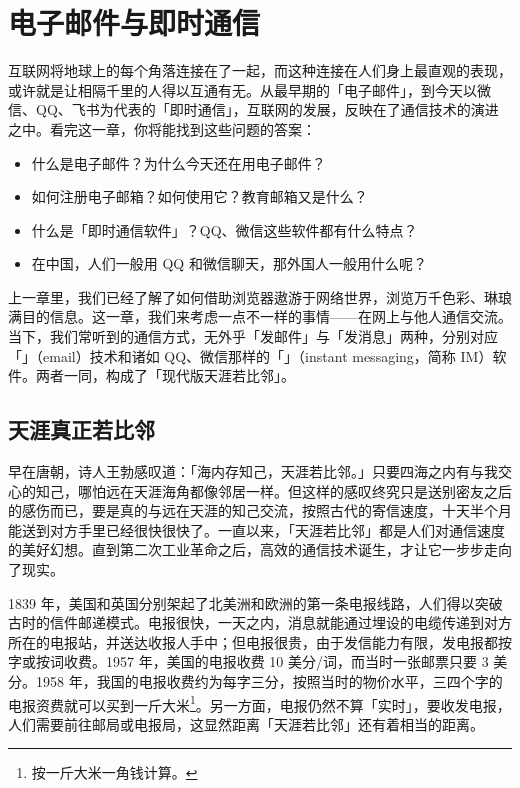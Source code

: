 
\chapter{电子邮件与即时通信}
\label{cha:mail-and-instant-messaging}

\begin{intro}
  互联网将地球上的每个角落连接在了一起，而这种连接在人们身上最直观的表现，或许就是让相隔千里的人得以互通有无。从最早期的「电子邮件」，到今天以微信、QQ、飞书为代表的「即时通信」，互联网的发展，反映在了通信技术的演进之中。看完这一章，你将能找到这些问题的答案：

  \begin{itemize}
    \item 什么是电子邮件？为什么今天还在用电子邮件？
    \item 如何注册电子邮箱？如何使用它？教育邮箱又是什么？
    \item 什么是「即时通信软件」？QQ、微信这些软件都有什么特点？
    \item 在中国，人们一般用 QQ 和微信聊天，那外国人一般用什么呢？
  \end{itemize}
\end{intro}

上一章里，我们已经了解了如何借助浏览器遨游于网络世界，浏览万千色彩、琳琅满目的信息。这一章，我们来考虑一点不一样的事情——在网上与他人通信交流。当下，我们常听到的通信方式，无外乎「发邮件」与「发消息」两种，分别对应「」（email）技术和诸如 QQ、微信那样的「」（instant messaging，简称 IM）软件。两者一同，构成了「现代版天涯若比邻」。

\section{天涯真正若比邻}

早在唐朝，诗人王勃感叹道：「海内存知己，天涯若比邻。」只要四海之内有与我交心的知己，哪怕远在天涯海角都像邻居一样。但这样的感叹终究只是送别密友之后的感伤而已，要是真的与远在天涯的知己交流，按照古代的寄信速度，十天半个月能送到对方手里已经很快很快了。一直以来，「天涯若比邻」都是人们对通信速度的美好幻想。直到第二次工业革命之后，高效的通信技术诞生，才让它一步步走向了现实。

1839 年，美国和英国分别架起了北美洲和欧洲的第一条电报线路，人们得以突破古时的信件邮递模式。电报很快，一天之内，消息就能通过埋设的电缆传递到对方所在的电报站，并送达收报人手中；但电报很贵，由于发信能力有限，发电报都按字或按词收费。1957 年，美国的电报收费 10 美分/词，而当时一张邮票只要 3 美分。1958 年，我国的电报收费约为每字三分，按照当时的物价水平，三四个字的电报资费就可以买到一斤大米\footnote{按一斤大米一角钱计算。}。另一方面，电报仍然不算「实时」，要收发电报，人们需要前往邮局或电报局，这显然距离「天涯若比邻」还有着相当的距离。

